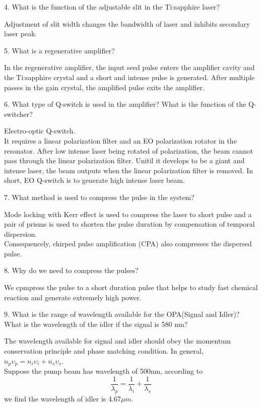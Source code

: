 \documentclass{article}
\begin{document}
4. What is the function of the adjustable slit in the Ti:sapphire laser?
\par 
Adjustment of slit width changes the bandwidth of laser and inhibits secondary laser peak. \\
\par 
5. What is a regenerative amplifier?
\par 
In the regenerative amplifier, the input seed pulse enters the amplifier cavity and the Ti:sapphire crystal and a short and intense pulse is generated. After multiple passes in the gain crystal, the amplified pulse exits the amplifier.\\
\par 
6. What type of Q-switch is used in the amplifier? What is the function of the Q-switcher?
\par 
Electro-optic Q-switch.\\
It requires a linear polarization filter and an EO polarization rotator in the resonator. After low intense laser being rotated of polarization, the beam cannot pass through the linear polarization filter. Unitil it develops to be a giant and intense laser, the beam outputs when the linear polarization filter is removed. In short, EO Q-switch is to generate high intense laser beam.\\

\par 
7. What method is used to compress the pulse in the system?
\par 
Mode locking with Kerr effect is used to compress the laser to short pulse and a pair of prisms is used to shorten the pulse duration by compensation of temporal dispersion.\\
 Consequencely, chirped pulse amplification (CPA) also compresses the dispersed pulse. \\
\par 
8. Why do we need to compress the pulses?
\par 
We cpmpress the pulse to a short duration pulse that helps to study fast chemical reaction and generate extremely high power.\\
\par 
9. What is the range of wavelength available for the OPA(Signal and Idler)? What is the wavelength of the idler if the signal is 580 nm?
\par 
The wavelength available for signal and idler should obey the momentum conservation principle and  phase matching condition. In general, $n_p\upsilon_p=n_i\upsilon_i+n_s\upsilon_s$.\\
Suppose the pump beam has wavelength of 500nm, according to
\begin{equation*}
\frac{1}{\lambda_p}=\frac{1}{\lambda_i}+\frac{1}{\lambda_s}
\end{equation*}
we find the wavelength of idler is 4.67$\mu m$.
\end{document}

